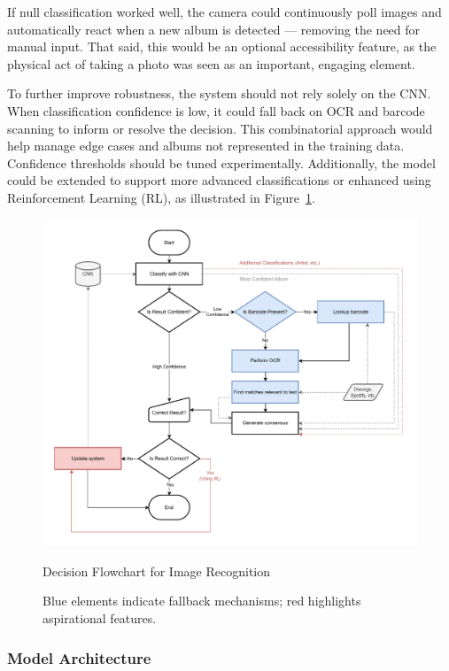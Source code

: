                 If null classification worked well, the camera could continuously poll images and automatically react when a new album is detected — removing the need for manual input. That said, this would be an optional accessibility feature, as the physical act of taking a photo was seen as an important, engaging element.
    
                To further improve robustness, the system should not rely solely on the CNN. When classification confidence is low, it could fall back on OCR and barcode scanning to inform or resolve the decision. This combinatorial approach would help manage edge cases and albums not represented in the training data. Confidence thresholds should be tuned experimentally. Additionally, the model could be extended to support more advanced classifications or enhanced using Reinforcement Learning (RL), as illustrated in Figure~\ref{fig:classifyFlowchart}.
    
                \begin{figure}
                    \centering
                    \includegraphics[width=0.85\linewidth]{images/ClassifyFlowchart.pdf}
                    \caption{Decision Flowchart for Image Recognition}
                    \label{fig:classifyFlowchart}
                    \caption*{Blue elements indicate fallback mechanisms; red highlights aspirational features.}
                \end{figure}
        
            \subsubsection{Model Architecture}
    

